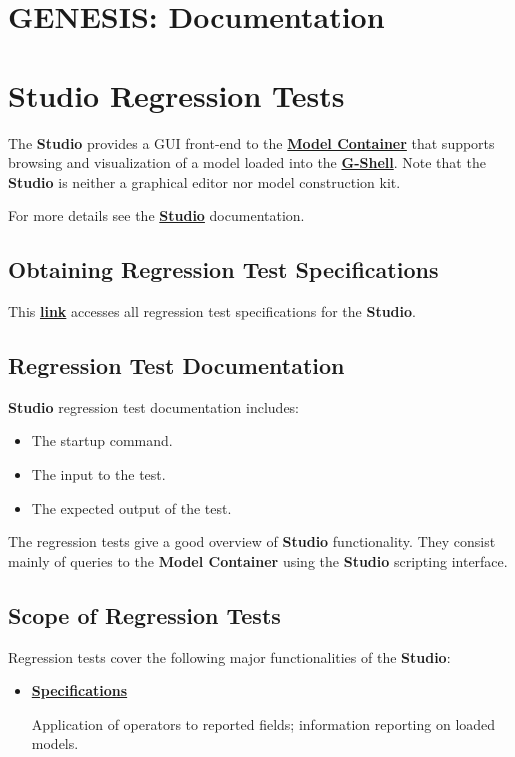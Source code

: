 \documentclass[12pt]{article}
\begin{document}
\section*{GENESIS: Documentation}

\section*{Studio Regression Tests}

The {\bf Studio} provides a GUI front-end to the \href{../model-container/model-container.tex}{\bf Model Container} that supports browsing and visualization of a model loaded into the \href{../gshell/gshell.tex}{\bf G-Shell}. Note that the {\bf Studio} is neither a graphical editor nor model construction kit.

For more details see the \href{../studio/studio.tex}{\bf Studio} documentation.

\subsection*{Obtaining Regression Test Specifications}

This \href{http://neurospaces.sourceforge.net/neurospaces_project/studio/tests/html/index.html}{\bf link} accesses all regression test specifications for the {\bf Studio}.

\subsection*{Regression Test Documentation}

{\bf Studio} regression test documentation includes:
\begin{itemize}
\item The startup command.
\item The input to the test.
\item The expected output of the test.
\end{itemize}
The regression tests give a good overview of {\bf Studio} functionality. They consist mainly of queries to the {\bf Model Container} using the {\bf Studio} scripting interface.

\subsection*{Scope of Regression Tests}

Regression tests cover the following major functionalities of the {\bf Studio}:
\begin{itemize}

\item[]\href{http://neurospaces.sourceforge.net/neurospaces_project/studio/tests/html/specifications/main.html}{\bf Specifications}

Application of operators to reported fields; information reporting on loaded models.

\end{itemize}
\end{document}
